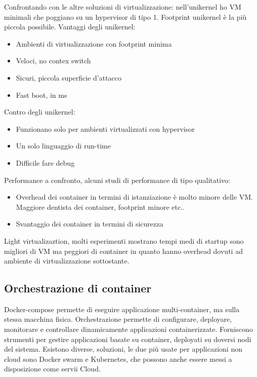 \documentclass[16px]{article}
\begin{document}
Confrontando con le altre soluzioni di virtualizzazione: nell'unikernel ho VM minimali che poggiano su un hypervisor di tipo 1. Footprint unikernel è la più piccola possibile. Vantaggi degli unikernel:
\begin{itemize}
\item Ambienti di virtualizzazione con footprint minima
\item Veloci, no contex switch
\item Sicuri, piccola superficie d'attacco
\item Fast boot, in ms
\end{itemize}
Contro degli unikernel:
\begin{itemize}
\item Funzionano solo per ambienti virtualizzati con hypervisor
\item Un solo linguaggio di run-time
\item Difficile fare debug
\end{itemize}
Performance a confronto, alcuni studi di performance di tipo qualitativo:
\begin{itemize}
\item Overhead dei container in termini di istanziazione è molto minore delle VM. Maggiore dentista dei container, footprint minore etc..
\item Svantaggio dei container in termini di sicurezza
\end{itemize}
Light virtualizaztion, molti esperimenti mostrano tempi medi di startup sono migliori di VM ma peggiori di container in quanto hanno overhead dovuti ad ambiente di virtualizzazione sottostante.
\subsection{Orchestrazione di container}
Docker-compose permette di eseguire applicazione multi-container, ma sulla stessa macchina fisica. Orchestrazione permette di configurare, deployare, monitorare e controllare dinamicamente applicazioni containerizzate. Forniscono strumenti per gestire applicazioni basate su container, deployati su doversi nodi del sistema. Esistono diverse, soluzioni, le due più usate per applicazioni non cloud sono Docker swarm e Kubernetes, che possono anche essere messi a disposizione come servii Cloud.
\end{document}
